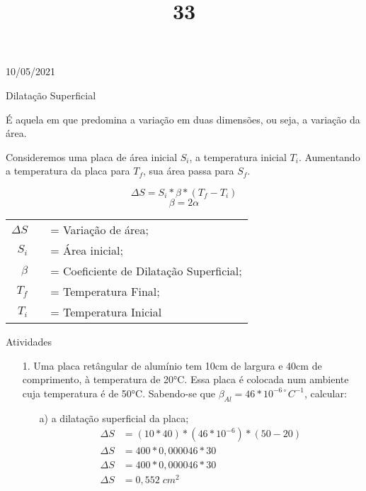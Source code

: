 \documentclass{SchoolBook}
\begin{document}
    \begin{day}{10/05/2021}
        \title{3}{Dilatação Superficial}
        
        É aquela em que predomina a variação em duas dimensões, ou seja, a variação da área.
        
        Consideremos uma placa de área inicial $S_i$, a temperatura inicial $T_i$. Aumentando a temperatura da placa para $T_f$, sua área passa para $S_f$.
        
        $$ \Delta S = S_i * \beta * (T_f - T_i) $$
        $$ \beta = 2\alpha $$
        
        \vspace{6pt}
        \begin{tabular}{ r c l }
            $ \Delta S $ &&= Variação de área;                     \\
                 $ S_i $ &&= Área inicial;                         \\
               $ \beta $ &&= Coeficiente de Dilatação Superficial; \\
                 $ T_f $ &&= Temperatura Final;                    \\
                 $ T_i $ &&= Temperatura Inicial
        \end{tabular}
        \vspace{6pt}
        
        \title{3}{Atividades}
        
        \begin{enumerate}
            \item[1.] Uma placa retângular de alumínio tem 10cm de largura e 40cm de comprimento, à temperatura de 20°C. Essa placa é colocada num ambiente cuja temperatura é de 50°C. Sabendo-se que $\beta_{Al} = 46 * 10^{-6\circ}C^{-1}$, calcular:
            
            \begin{enumerate}
                \item[a)] a dilatação superficial da placa;
                \begin{align*}
                    \Delta S &= (10 * 40) * (46 * 10^{-6}) * (50 - 20) \\
                    \Delta S &= 400 * 0,000046 * 30                    \\
                    \Delta S &= 400 * 0,000046 * 30                    \\
                    \Delta S &= 0,552\;cm^2
                \end{align*}
                

\end{enumerate}
\end{enumerate}
\end{day}
\end{document}
